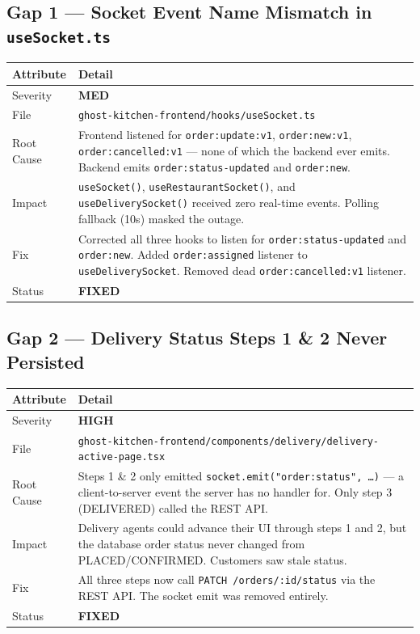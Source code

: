 \documentclass[11pt,a4paper]{article}
\newcommand{\FIXED}{\colorbox{successgreen!20}{\color{successgreen}\bfseries\small FIXED}}
\newcommand{\HIGH}{\colorbox{dangerred!18}{\color{dangerred}\bfseries\tiny HIGH}}
\newcommand{\MEDIUM}{\colorbox{warnyellow!18}{\color{warnyellow}\bfseries\tiny MED}}
\begin{document}
\vspace{8pt}

\subsection{Gap 1 — Socket Event Name Mismatch in \texttt{useSocket.ts}}

\begin{tabularx}{\textwidth}{@{}lX@{}}
\toprule
\rowcolor{navyblue}\color{white}\bfseries Attribute & \color{white}\bfseries Detail \\
\midrule
Severity    & \MEDIUM \\
\rowcolor{rowalt}
File        & \texttt{ghost-kitchen-frontend/hooks/useSocket.ts} \\
Root Cause  & Frontend listened for \texttt{order:update:v1}, \texttt{order:new:v1}, \texttt{order:cancelled:v1} — none of which the backend ever emits. Backend emits \texttt{order:status-updated} and \texttt{order:new}. \\
\rowcolor{rowalt}
Impact      & \texttt{useSocket()}, \texttt{useRestaurantSocket()}, and \texttt{useDeliverySocket()} received zero real-time events. Polling fallback (10s) masked the outage. \\
Fix         & Corrected all three hooks to listen for \texttt{order:status-updated} and \texttt{order:new}. Added \texttt{order:assigned} listener to \texttt{useDeliverySocket}. Removed dead \texttt{order:cancelled:v1} listener. \\
\rowcolor{rowalt}
Status      & \FIXED \\
\bottomrule
\end{tabularx}

\subsection{Gap 2 — Delivery Status Steps 1 \& 2 Never Persisted}

\begin{tabularx}{\textwidth}{@{}lX@{}}
\toprule
\rowcolor{navyblue}\color{white}\bfseries Attribute & \color{white}\bfseries Detail \\
\midrule
Severity    & \HIGH \\
\rowcolor{rowalt}
File        & \texttt{ghost-kitchen-frontend/components/delivery/delivery-active-page.tsx} \\
Root Cause  & Steps 1 \& 2 only emitted \texttt{socket.emit("order:status", …)} — a client-to-server event the server has no handler for. Only step 3 (DELIVERED) called the REST API. \\
\rowcolor{rowalt}
Impact      & Delivery agents could advance their UI through steps 1 and 2, but the database order status never changed from PLACED/CONFIRMED. Customers saw stale status. \\
Fix         & All three steps now call \texttt{PATCH /orders/:id/status} via the REST API. The socket emit was removed entirely. \\
\rowcolor{rowalt}
Status      & \FIXED \\
\bottomrule
\end{tabularx}
\end{document}
